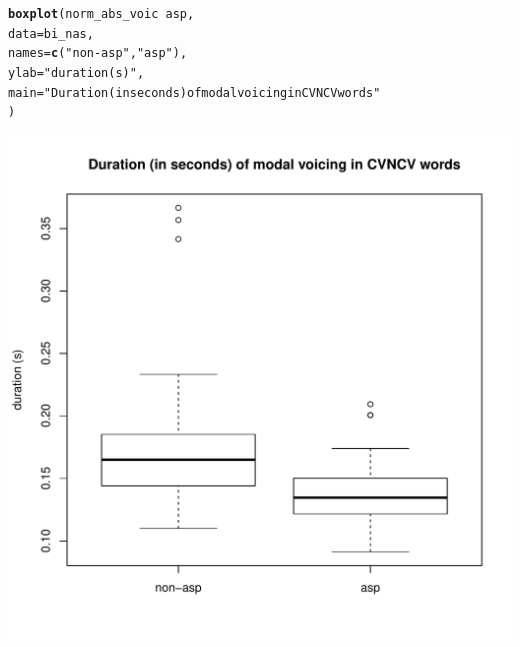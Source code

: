 \documentclass[a4paper,11pt]{article}\usepackage[]{graphicx}\usepackage[]{color}
\makeatletter
\def\maxwidth{ %
  \ifdim\Gin@nat@width>\linewidth
    \linewidth
  \else
    \Gin@nat@width
  \fi
}
\newcommand{\hlstr}[1]{\textcolor[rgb]{0.192,0.494,0.8}{#1}}%
\newcommand{\hlopt}[1]{\textcolor[rgb]{0,0,0}{#1}}%
\newcommand{\hlstd}[1]{\textcolor[rgb]{0.345,0.345,0.345}{#1}}%
\newcommand{\hlkwc}[1]{\textcolor[rgb]{0.333,0.667,0.333}{#1}}%
\newcommand{\hlkwd}[1]{\textcolor[rgb]{0.737,0.353,0.396}{\textbf{#1}}}%
\newenvironment{kframe}{%
 \def\at@end@of@kframe{}%
 \ifinner\ifhmode%
  \def\at@end@of@kframe{\end{minipage}}%
  \begin{minipage}{\columnwidth}%
 \fi\fi%
 \def\FrameCommand##1{\hskip\@totalleftmargin \hskip-\fboxsep
 \colorbox{shadecolor}{##1}\hskip-\fboxsep
     \hskip-\linewidth \hskip-\@totalleftmargin \hskip\columnwidth}%
 \MakeFramed {\advance\hsize-\width
   \@totalleftmargin\z@ \linewidth\hsize
   \@setminipage}}%
 {\par\unskip\endMakeFramed%
 \at@end@of@kframe}
\newenvironment{knitrout}{}{} %
\makeatother
\begin{document}
\begin{knitrout}
\color{fgcolor}\begin{kframe}
\begin{alltt}
\hlkwd{boxplot}\hlstd{(norm_abs_voic} \hlopt{~} \hlstd{asp,}
        \hlkwc{data} \hlstd{= bi_nas,}
        \hlkwc{names} \hlstd{=} \hlkwd{c}\hlstd{(}\hlstr{"non-asp"}\hlstd{,} \hlstr{"asp"}\hlstd{),}
        \hlkwc{ylab} \hlstd{=} \hlstr{"duration (s)"}\hlstd{,}
        \hlkwc{main} \hlstd{=} \hlstr{"Duration (in seconds) of modal voicing in CVNCV words"}
        \hlstd{)}
\end{alltt}
\end{kframe}

{\centering \includegraphics[width=\maxwidth]{img/bi-nas-box-1} 

}



\end{knitrout}
\end{document}
